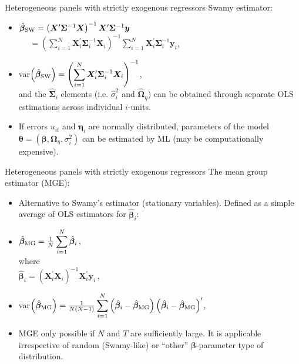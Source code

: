 \documentclass[usenames,dvipsnames]{beamer}
\begin{document}
\begin{frame}{Heterogeneous panels with strictly exogenous regressors}
Swamy estimator:\\ \medskip
    \begin{itemize}
        \item $\hat{\bm{\beta}}_{\textnormal{SW}} = 
        \left( \bm{X}^{\prime} \bm{\Sigma}^{-1} \bm{X}
        \right)^{-1} \bm{X}^{\prime} \bm{\Sigma}^{-1} \bm{y}$\\ \medskip
        $~~~~~~=\left( \displaystyle\sum_{i=1}^N 
        \bm{X}_i^{\prime} \bm{\Sigma}_i^{-1} \bm{X}_i \right)^{-1}
        \displaystyle\sum_{i=1}^N 
        \bm{X}_i^{\prime} \bm{\Sigma}_i^{-1} \bm{y}_i$, 
        \bigskip
        \item var$\left( \hat{\bm{\beta}}_{\textnormal{SW}} \right) = \left( \displaystyle\sum_{i=1}^N 
        \bm{X}_i^{\prime} \bm{\Sigma}_i^{-1} \bm{X}_i \right)^{-1}$,\\ \medskip
        and the $\hat{\bm{\Sigma}}_i$ elements (i.e. $\hat{\sigma}^2_i$ and $\hat{\bm{\Omega}}_{\eta}$) can be obtained through separate OLS estimations across individual $i$-units.\\ \medskip
        \item If errors $u_{it}$ and $\bm{\eta}_i$ are normally distributed, parameters of the model $\bm{\theta}=(\bm{\beta},\bm{\Omega}_{\eta}, \sigma^2_i)$ can be estimated by ML (may be computationally expensive).
    \end{itemize}
\end{frame}
\begin{frame}{Heterogeneous panels with strictly exogenous regressors}
The mean group estimator (MGE):\\ \medskip
    \begin{itemize}
        \item Alternative to Swamy's estimator (stationary variables). Defined as a simple average of OLS estimators for $\hat{\bm{\beta}}_i$:\\
        \bigskip
        \item $\hat{\bm{\beta}}_{\textnormal{MG}} =
        \frac{1}{N} \displaystyle\sum_{i=1}^N \hat{\bm{\beta}}_i\,,$\\ \medskip
        where \\ \smallskip
        $\hat{\bm{\beta}}_i = (\bm{X}_i^{\prime} \bm{X}_i)^{-1}\bm{X}_i^{\prime} \bm{y}_i\,,$
        \medskip
        \item var$\left( \hat{\bm{\beta}}_{\textnormal{MG}} \right) =
        \frac{1}{N(N-1)} \displaystyle\sum_{i=1}^N
        \left( \hat{\bm{\beta}}_i - \hat{\bm{\beta}}_{\textnormal{MG}}  \right)
        \left( \hat{\bm{\beta}}_i - \hat{\bm{\beta}}_{\textnormal{MG}}  \right)^{\prime}$,
        \medskip
        \item MGE only possible if $N$ and $T$ are sufficiently large. It is applicable irrespective of random (Swamy-like) or ``other'' $\bm{\beta}$-parameter type of distribution.
    \end{itemize}
\end{frame}
\end{document}
